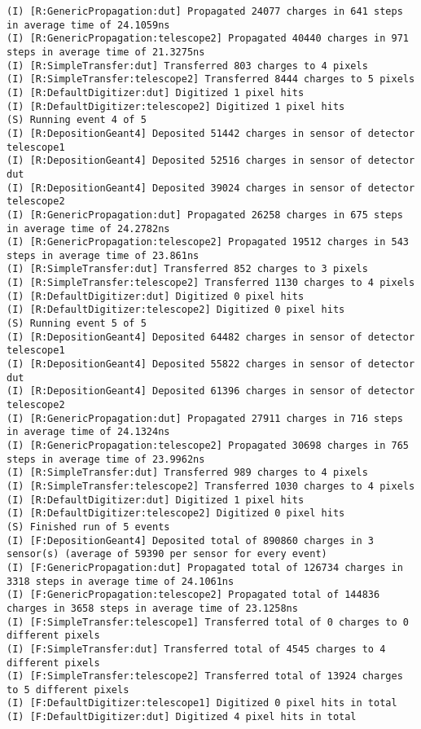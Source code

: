 \begin{lstlisting}[breaklines]
(I) [R:GenericPropagation:dut] Propagated 24077 charges in 641 steps in average time of 24.1059ns
(I) [R:GenericPropagation:telescope2] Propagated 40440 charges in 971 steps in average time of 21.3275ns
(I) [R:SimpleTransfer:dut] Transferred 803 charges to 4 pixels
(I) [R:SimpleTransfer:telescope2] Transferred 8444 charges to 5 pixels
(I) [R:DefaultDigitizer:dut] Digitized 1 pixel hits
(I) [R:DefaultDigitizer:telescope2] Digitized 1 pixel hits
(S) Running event 4 of 5
(I) [R:DepositionGeant4] Deposited 51442 charges in sensor of detector telescope1
(I) [R:DepositionGeant4] Deposited 52516 charges in sensor of detector dut
(I) [R:DepositionGeant4] Deposited 39024 charges in sensor of detector telescope2
(I) [R:GenericPropagation:dut] Propagated 26258 charges in 675 steps in average time of 24.2782ns
(I) [R:GenericPropagation:telescope2] Propagated 19512 charges in 543 steps in average time of 23.861ns
(I) [R:SimpleTransfer:dut] Transferred 852 charges to 3 pixels
(I) [R:SimpleTransfer:telescope2] Transferred 1130 charges to 4 pixels
(I) [R:DefaultDigitizer:dut] Digitized 0 pixel hits
(I) [R:DefaultDigitizer:telescope2] Digitized 0 pixel hits
(S) Running event 5 of 5
(I) [R:DepositionGeant4] Deposited 64482 charges in sensor of detector telescope1
(I) [R:DepositionGeant4] Deposited 55822 charges in sensor of detector dut
(I) [R:DepositionGeant4] Deposited 61396 charges in sensor of detector telescope2
(I) [R:GenericPropagation:dut] Propagated 27911 charges in 716 steps in average time of 24.1324ns
(I) [R:GenericPropagation:telescope2] Propagated 30698 charges in 765 steps in average time of 23.9962ns
(I) [R:SimpleTransfer:dut] Transferred 989 charges to 4 pixels
(I) [R:SimpleTransfer:telescope2] Transferred 1030 charges to 4 pixels
(I) [R:DefaultDigitizer:dut] Digitized 1 pixel hits
(I) [R:DefaultDigitizer:telescope2] Digitized 0 pixel hits
(S) Finished run of 5 events
(I) [F:DepositionGeant4] Deposited total of 890860 charges in 3 sensor(s) (average of 59390 per sensor for every event)
(I) [F:GenericPropagation:dut] Propagated total of 126734 charges in 3318 steps in average time of 24.1061ns
(I) [F:GenericPropagation:telescope2] Propagated total of 144836 charges in 3658 steps in average time of 23.1258ns
(I) [F:SimpleTransfer:telescope1] Transferred total of 0 charges to 0 different pixels
(I) [F:SimpleTransfer:dut] Transferred total of 4545 charges to 4 different pixels
(I) [F:SimpleTransfer:telescope2] Transferred total of 13924 charges to 5 different pixels
(I) [F:DefaultDigitizer:telescope1] Digitized 0 pixel hits in total
(I) [F:DefaultDigitizer:dut] Digitized 4 pixel hits in total

\end{lstlisting}
